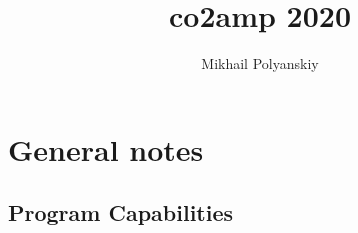 \documentclass{report}
\begin{document}
\title{co2amp 2020}
\author{Mikhail Polyanskiy}
\maketitle

\tableofcontents

\chapter{General notes}

\section{Program Capabilities}
\end{document}
